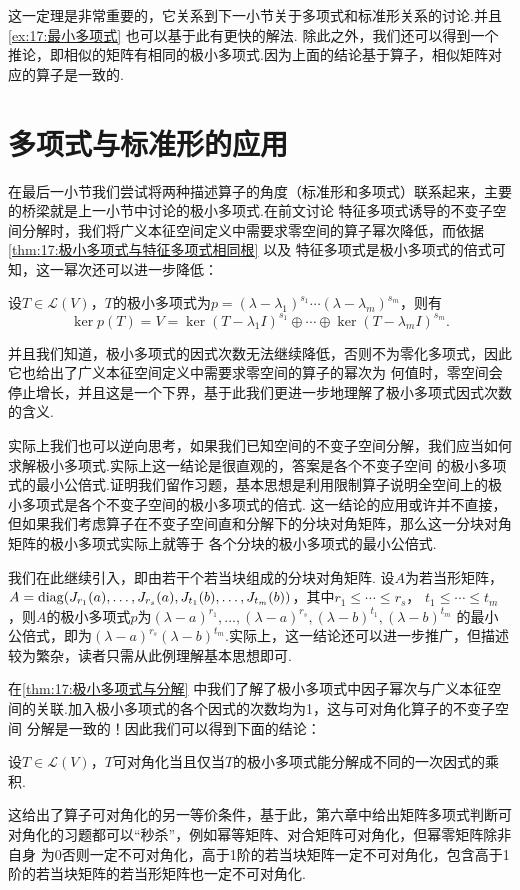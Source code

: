 这一定理是非常重要的，它关系到下一小节关于多项式和标准形关系的讨论.并且\autoref{ex:17:最小多项式} 也可以基于此有更快的解法.
除此之外，我们还可以得到一个推论，即相似的矩阵有相同的极小多项式.因为上面的结论基于算子，相似矩阵对应的算子是一致的.

\section{多项式与标准形的应用}
在最后一小节我们尝试将两种描述算子的角度（标准形和多项式）联系起来，主要的桥梁就是上一小节中讨论的极小多项式.在前文讨论
特征多项式诱导的不变子空间分解时，我们将广义本征空间定义中需要求零空间的算子幂次降低，而依据\autoref{thm:17:极小多项式与特征多项式相同根} 以及
特征多项式是极小多项式的倍式可知，这一幂次还可以进一步降低：
\begin{theorem} \label{thm:17:极小多项式与分解}
    设$T\in \mathcal{L}(V)$，$T$的极小多项式为$p=(\lambda-\lambda_1)^{s_1}\cdots(\lambda-\lambda_m)^{s_m}$，则有
    \[\ker p(T)=V=\ker (T-\lambda_1I)^{s_1}\oplus\cdots\oplus\ker (T-\lambda_mI)^{s_m}.\]
\end{theorem}
并且我们知道，极小多项式的因式次数无法继续降低，否则不为零化多项式，因此它也给出了广义本征空间定义中需要求零空间的算子的幂次为
何值时，零空间会停止增长，并且这是一个下界，基于此我们更进一步地理解了极小多项式因式次数的含义.

实际上我们也可以逆向思考，如果我们已知空间的不变子空间分解，我们应当如何求解极小多项式.实际上这一结论是很直观的，答案是各个不变子空间
的极小多项式的最小公倍式.证明我们留作习题，基本思想是利用限制算子说明全空间上的极小多项式是各个不变子空间的极小多项式的倍式.
这一结论的应用或许并不直接，但如果我们考虑算子在不变子空间直和分解下的分块对角矩阵，那么这一分块对角矩阵的极小多项式实际上就等于
各个分块的极小多项式的最小公倍式.
\begin{example} \label{thm:17:若当形矩阵极小多项式}
    我们在此继续引入，即由若干个若当块组成的分块对角矩阵. 设$A$为若当形矩阵，
    $A=\operatorname{diag}(J_{r_1}(a),\ldots,J_{r_s}(a),J_{t_1}(b),\ldots,J_{t_m}(b))$，其中$r_1\leqslant\cdots\leqslant r_s$，
    $t_1\leqslant\cdots\leqslant t_m$，则$A$的极小多项式$p$为$(\lambda-a)^{r_1},\ldots,(\lambda-a)^{r_s},(\lambda-b)^{t_1},(\lambda-b)^{t_m}$
    的最小公倍式，即为$(\lambda-a)^{r_s}(\lambda-b)^{t_m}$.实际上，这一结论还可以进一步推广，但描述较为繁杂，读者只需从此例理解基本思想即可.
\end{example}
在\autoref{thm:17:极小多项式与分解} 中我们了解了极小多项式中因子幂次与广义本征空间的关联.加入极小多项式的各个因式的次数均为1，这与可对角化算子的不变子空间
分解是一致的！因此我们可以得到下面的结论：
\begin{theorem}
    设$T\in \mathcal{L}(V)$，$T$可对角化当且仅当$T$的极小多项式能分解成不同的一次因式的乘积.
\end{theorem}
这给出了算子可对角化的另一等价条件，基于此，第六章中给出矩阵多项式判断可对角化的习题都可以``秒杀''，例如幂等矩阵、对合矩阵可对角化，但幂零矩阵除非自身
为0否则一定不可对角化，高于1阶的若当块矩阵一定不可对角化，包含高于1阶的若当块矩阵的若当形矩阵也一定不可对角化.

